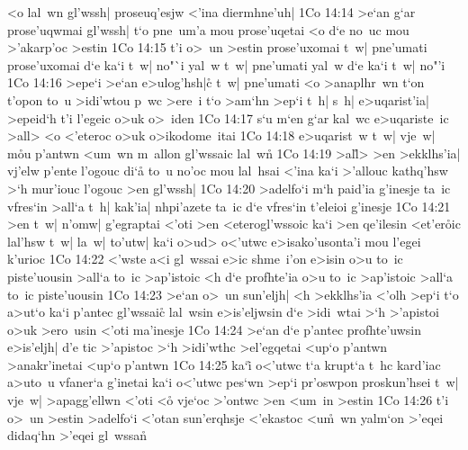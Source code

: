 <o
lal~wn
gl'wssh|
proseuq'esjw
<'ina
diermhne'uh|\bibvsend
\vs 1Co 14:14
>e`an
g`ar
prose'uqwmai
gl'wssh|
t`o
pne~um'a
mou
prose'uqetai
<o
d`e
no~uc
mou
>'akarp'oc
>estin\bibvsend
\vs 1Co 14:15
t'i
o>~un
>estin
prose'uxomai
t~w|
pne'umati
prose'uxomai
d`e
ka`i
t~w|
no"`i
yal~w
t~w|
pne'umati
yal~w
d`e
ka`i
t~w|
no"'i\bibvsend
\vs 1Co 14:16
>epe`i
>e`an
e>ulog'hsh|c\r{}
t~w|
pne'umati
<o
>anaplhr~wn
t`on
t'opon
to~u
>idi'wtou
p~wc
>ere~i
t`o
>am`hn
>ep`i
t~h|
s~h|
e>uqarist'ia|
>epeid`h
t'i
l'egeic
o>uk
o>~iden\bibvsend
\vs 1Co 14:17
s`u
m`en
g`ar
kal~wc
e>uqariste~ic
>all>
<o
<'eteroc
o>uk
o>ikodome~itai\bibvsend
\vs 1Co 14:18
e>uqarist~w
t~w|
vje~w|
m\r{o}u
p'antwn
<um~wn
m~allon
gl'wssaic
lal~w\r{n}\bibvsend
{}
\vs 1Co 14:19
>al\r{l}>
>en
>ekklhs'ia|
vj'elw
p'ente
l'ogouc
di`a\r{}
to~u
no'oc
mou
lal~hsai
<'ina
ka`i
>'allouc
kathq'hsw
>`h
mur'iouc
l'ogouc
>en
gl'wssh|\bibvsend
\vs 1Co 14:20
>adelfo`i
m`h
paid'ia
g'inesje
ta~ic
vfres`in
>all`a
t~h|
kak'ia|
nhpi'azete
ta~ic
d`e
vfres`in
t'eleioi
g'inesje\bibvsend
\vs 1Co 14:21
>en
t~w|
n'omw|
g'egraptai
<'oti
>en
<eterogl'wssoic
ka`i
>en
qe'ilesin
<et'er\r{o}ic
lal'hsw
t~w|
la~w|
to'utw|
ka`i
o>ud>
o<'utwc
e>isako'usonta'i
mou
l'egei
k'urioc\bibvsend
\vs 1Co 14:22
<'wste
a<i
gl~wssai
e>ic
shme~i'on
e>isin
o>u
to~ic
piste'uousin
>all`a
to~ic
>ap'istoic
<h
d`e
profhte'ia
o>u
to~ic
>ap'istoic
>all`a
to~ic
piste'uousin\bibvsend
\vs 1Co 14:23
>e`an
o>~un
sun'eljh|
<h
>ekklhs'ia
<'olh
>ep`i
t`o
a>ut`o
ka`i
p'antec
gl'wssaic\r{}
lal~wsin
e>is'eljwsin
d`e
>idi~wtai
>`h
>'apistoi
o>uk
>ero~usin
<'oti
ma'inesje\bibvsend
\vs 1Co 14:24
>e`an
d`e
p'antec
profhte'uwsin
e>is'eljh|
d'e
tic
>'apistoc
>`h
>idi'wthc
>el'egqetai
<up`o
p'antwn
>anakr'inetai
<up`o
p'antwn\bibvsend
\vs 1Co 14:25
ka`i\r{}
o<'utwc
t`a
krupt`a
t~hc
kard'iac
a>uto~u
vfaner`a
g'inetai
ka`i
o<'utwc
pes`wn
>ep`i
pr'oswpon
proskun'hsei
t~w|
vje~w|
>apagg'ellwn
<'oti
<o\r{}
vje`oc
>'ontwc
>en
<um~in
>estin\bibvsend
\vs 1Co 14:26
t'i
o>~un
>estin
>adelfo`i
<'otan
sun'erqhsje
<'ekastoc
<u\r{m}~wn
yalm`on
>'eqei
didaq`hn
>'eqei
gl~wssan\r{}
